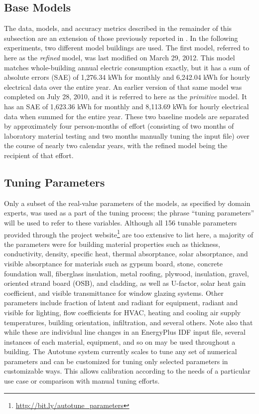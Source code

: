 \documentclass[preprint, review, 12pt]{elsarticle}
\begin{document}
\subsection{Base Models}
The data, models, and accuracy metrics described in the remainder of this subsection are an extension of those previously reported in \cite{cit:garrett2013}. In the following experiments, two different model buildings are used. The first model, referred to here as the \emph{refined} model, was last modified on March 29, 2012. This model matches whole-building annual electric consumption exactly, but it has a sum of absolute errors (SAE) of 1,276.34 kWh for monthly and 6,242.04 kWh for hourly electrical data over the entire year. An earlier version of that same model was completed on July 28, 2010, and it is referred to here as the \emph{primitive} model. It has an SAE of 1,623.36 kWh for monthly and 8,113.69 kWh for hourly electrical data when summed for the entire year. These two baseline models are separated by approximately four person-months of effort (consisting of two months of laboratory material testing and two months manually tuning the input file) over the course of nearly two calendar years, with the refined model being the recipient of that effort.

\subsection{Tuning Parameters}
Only a subset of the real-value parameters of the models, as specified by domain experts, was used as a part of the tuning process; the phrase ``tuning parameters'' will be used to refer to these variables. Although all 156 tunable parameters provided through the project website\footnote{\url{http://bit.ly/autotune_parameters}} are too extensive to list here, a majority of the parameters were for building material properties such as thickness, conductivity, density, specific heat, thermal absorptance, solar absorptance, and visible absorptance for materials such as gypsum board, stone, concrete foundation wall, fiberglass insulation, metal roofing, plywood, insulation, gravel, oriented strand board (OSB), and cladding, as well as U-factor, solar heat gain coefficient, and visible transmittance for window glazing systems. Other parameters include fraction of latent and radiant %
for equipment, radiant and visible for lighting, flow coefficients for HVAC, heating and cooling air supply temperatures, building orientation, infiltration, and several others. Note also that while these are individual line changes in an EnergyPlus IDF input file, several instances of each material, equipment, and so on may be used throughout a building. The Autotune system currently scales to tune any set of numerical parameters and can be customized for tuning only selected parameters in customizable ways. This allows calibration according to the needs of a particular use case or comparison with manual tuning efforts.
\end{document}
